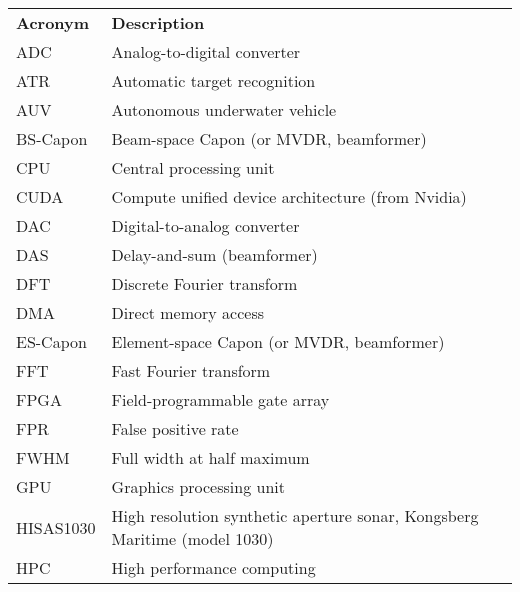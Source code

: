 \begin{longtable}{l l}
	\textbf{Acronym} & \textbf{Description}                                                      \\
	ADC              & Analog-to-digital converter                                               \\
	ATR              & Automatic target recognition                                              \\
	AUV              & Autonomous underwater vehicle                                             \\
	BS-Capon         & Beam-space Capon (or MVDR, beamformer)                                    \\
	CPU              & Central processing unit                                                   \\
	CUDA             & Compute unified device architecture (from Nvidia)                         \\
	DAC              & Digital-to-analog converter                                               \\
	DAS              & Delay-and-sum (beamformer)                                                \\
	DFT              & Discrete Fourier transform                                                \\
	DMA              & Direct memory access                                                      \\
	ES-Capon         & Element-space Capon (or MVDR, beamformer)                                 \\
	FFT              & Fast Fourier transform                                                    \\
	FPGA             & Field-programmable gate array                                             \\
	FPR              & False positive rate                                                       \\
	FWHM             & Full width at half maximum                                                \\
	GPU              & Graphics processing unit                                                  \\
	HISAS1030        & High resolution synthetic aperture sonar, Kongsberg Maritime (model 1030) \\
	HPC              & High performance computing                                                \\

\end{longtable}
